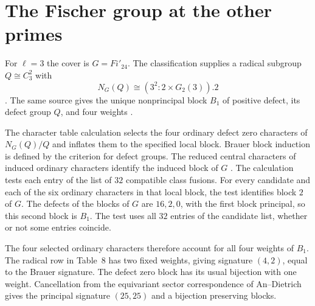 \section{The Fischer group at the other primes}

For $\ell=3$ the cover is $G=Fi'_{24}$. The classification supplies
a radical subgroup $Q\cong C_3^2$ with
\[
 N_G(Q)\cong(3^2\!:\!2\times G_2(3)).2
\]
\cite[Proposition~4.1 and Table~1]{AnCannonOBrienUngerFi24}.
The same source gives the unique nonprincipal block $B_1$ of
positive defect, its defect group $Q$, and four weights
\cite[Lemma~4.2(c) and Theorem~4.3]{AnCannonOBrienUngerFi24}.

The character table calculation selects the four ordinary defect zero
characters of $N_G(Q)/Q$ and inflates them to the specified local block.
Brauer block induction is defined by the criterion for defect groups. The
reduced central characters of induced ordinary characters identify the induced block of $G$ \cite[Theorem~4.14 and Lemma~6.1]{Navarro1998}. The
calculation tests each entry of the list of $32$ compatible class fusions.
For every candidate and each of the six ordinary characters in that local
block, the test identifies block $2$ of $G$. The defects of the blocks of $G$ are
$16,2,0$, with the first block principal, so this second block is $B_1$. The
test uses all $32$ entries of the candidate list, whether or not some
entries coincide.

The four selected ordinary characters therefore account for all four weights
of $B_1$. The radical row in Table~8 has two fixed weights, giving signature
$(4,2)$, equal to the Brauer signature. The defect zero block has its usual
bijection with one weight. Cancellation from the equivariant sector
correspondence of An--Dietrich \cite[Section~4.3.4]{AnDietrich2012} gives
the principal signature $(25,25)$ and a bijection preserving blocks.

